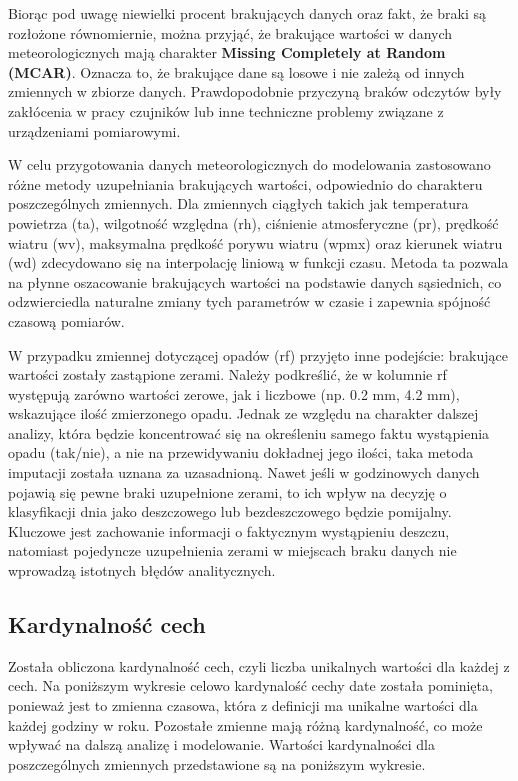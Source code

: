\documentclass[10pt,a4paper]{article}
\begin{document}
\par
\hspace{0.75cm}
Biorąc pod uwagę niewielki procent brakujących danych oraz fakt, że braki są rozłożone równomiernie, można przyjąć, że brakujące wartości w danych meteorologicznych mają charakter \textbf{Missing Completely at Random (MCAR)}. Oznacza to, że brakujące dane są losowe i nie zależą od innych zmiennych w zbiorze danych. Prawdopodobnie przyczyną braków odczytów były zakłócenia w pracy czujników lub inne techniczne problemy związane z urządzeniami pomiarowymi.
\par
\hspace{0.75cm}
W celu przygotowania danych meteorologicznych do modelowania zastosowano różne metody uzupełniania brakujących wartości, odpowiednio do charakteru poszczególnych zmiennych. Dla zmiennych ciągłych takich jak temperatura powietrza (ta), wilgotność względna (rh), ciśnienie atmosferyczne (pr), prędkość wiatru (wv), maksymalna prędkość porywu wiatru (wpmx) oraz kierunek wiatru (wd) zdecydowano się na interpolację liniową w funkcji czasu. Metoda ta pozwala na płynne oszacowanie brakujących wartości na podstawie danych sąsiednich, co odzwierciedla naturalne zmiany tych parametrów w czasie i zapewnia spójność czasową pomiarów.
\par
\hspace{0.75cm}
W przypadku zmiennej dotyczącej opadów (rf) przyjęto inne podejście: brakujące wartości zostały zastąpione zerami. Należy podkreślić, że w kolumnie rf występują zarówno wartości zerowe, jak i liczbowe (np. 0.2 mm, 4.2 mm), wskazujące ilość zmierzonego opadu. Jednak ze względu na charakter dalszej analizy, która będzie koncentrować się na określeniu samego faktu wystąpienia opadu (tak/nie), a nie na przewidywaniu dokładnej jego ilości, taka metoda imputacji została uznana za uzasadnioną. Nawet jeśli w godzinowych danych pojawią się pewne braki uzupełnione zerami, to ich wpływ na decyzję o klasyfikacji dnia jako deszczowego lub bezdeszczowego będzie pomijalny. Kluczowe jest zachowanie informacji o faktycznym wystąpieniu deszczu, natomiast pojedyncze uzupełnienia zerami w miejscach braku danych nie wprowadzą istotnych błędów analitycznych.


\vspace{1.5em} 
\subsection*{Kardynalność cech}
Została obliczona kardynalność cech, czyli liczba unikalnych wartości dla każdej z cech. 
Na poniższym wykresie celowo kardynalość cechy date została pominięta, ponieważ jest to zmienna czasowa, która z definicji ma unikalne wartości dla każdej godziny w roku. Pozostałe zmienne mają różną kardynalność, co może wpływać na dalszą analizę i modelowanie. Wartości kardynalności dla poszczególnych zmiennych przedstawione są na poniższym wykresie.
\end{document}

